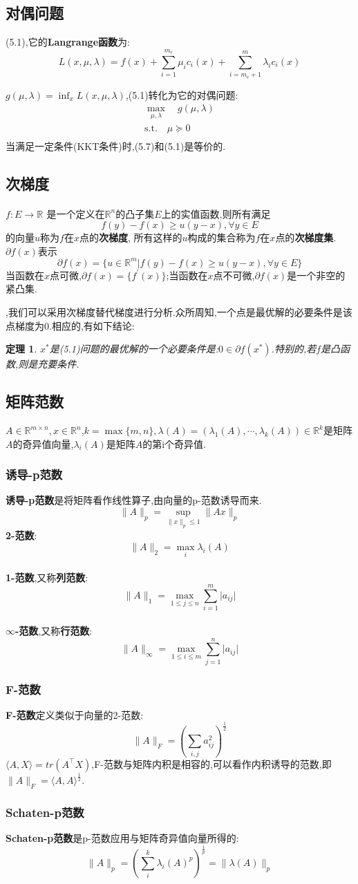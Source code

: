 \documentclass[UTF8]{ctexart}
\newtheorem{theo}{定理}[section]
\newcommand{\s}{\quad}
\renewcommand{\b}{\textbf}
\newcommand{\p}{\paragraph{}\s}
\newcommand{\ssect}{\subsection}
\newcommand{\sssect}{\subsubsection}
\newcommand{\equSplit}[1]{\begin{equation}\begin{split}#1\end{split}\end{equation}}
\newcommand{\equ}[1]{\begin{equation}#1\end{equation}}
\newcommand{\Tst}{\text{s.t.}\s}
\newcommand{\abs}[1]{\lvert#1\rvert}
\newcommand{\norm}[1]{\lVert#1\rVert}
\newcommand{\inprod}[1]{\langle#1\rangle}
\newcommand{\Real}[1]{\mathbb{R}^{#1}}
\numberwithin{equation}{section}
\begin{document}
\ssect{对偶问题}

(5.1),它的\b{Langrange函数}为:
\equ{L(x,\mu,\lambda)=f(x)+\sum^{m_e}_{i=1}\mu_ic_i(x)+\sum^{m}_{i=m_e+1}\lambda_ic_i(x)}

$g(\mu,\lambda)=\inf_xL(x,\mu,\lambda)$,(5.1)转化为它的对偶问题:
\equSplit{
	\max_{\mu,\lambda}\s g(\mu,\lambda)\\
	\Tst\mu\succeq0\\
}
当满足一定条件(KKT条件)时,(5.7)和(5.1)是等价的.

\ssect{次梯度}

\p$f:E\rightarrow\Real{}$
是一个定义在$\Real{n}$的凸子集$E$上的实值函数,则所有满足
\equ{f(y)-f(x)\geq u(y-x),\forall y\in E}
的向量$u$称为$f$在$x$点的\b{次梯度},
所有这样的$u$构成的集合称为$f$在$x$点的\b{次梯度集}.
$\partial f(x)$表示
\equ{\partial f(x)=\{u\in\Real{m}\vert f(y)-f(x)\geq u(y-x),\forall y\in E\}}
当函数在$x$点可微,$\partial f(x)=\{f^\prime(x)\}$;当函数在$x$点不可微,$\partial f(x)$是一个非空的紧凸集.

,我们可以采用次梯度替代梯度进行分析.众所周知,一个点是最优解的必要条件是该点梯度为0.相应的,有如下结论:
\begin{theo}
	$x^*$是(5.1)问题的最优解的一个必要条件是:$0\in\partial f(x^*)$.特别的,若$f$是凸函数,则是充要条件.
\end{theo}

\ssect{矩阵范数}
$A\in\Real{m\times n},x\in\Real{n}$,$k=\max\{m,n\},\lambda(A)=(\lambda_1(A),\cdots,\lambda_k(A))\in\Real{k}$是矩阵$A$的奇异值向量,$\lambda_i(A)$是矩阵$A$的第i个奇异值.
\sssect{诱导-p范数}
\b{诱导-p范数}是将矩阵看作线性算子,由向量的p-范数诱导而来.
\[\norm{A}_p=\sup_{\norm{x}_p\leq1}\norm{Ax}_p\]
\b{2-范数}:
\[\norm{A}_2=\max_i\lambda_i(A)\]

\p\b{1-范数},又称\b{列范数}:
\[\norm{A}_1=\max_{1\leq j\leq n}\sum_{i=1}^m\abs{a_{ij}}\]

\p\b{$\infty$-范数},又称\b{行范数}:
\[\norm{A}_\infty=\max_{1\leq i\leq m}\sum_{j=1}^n\abs{a_{ij}}\]

\sssect{F-范数}
\b{F-范数}定义类似于向量的2-范数:
\[\norm{A}_F=(\sum_{i,j}a_{ij}^2)^{\frac{1}{2}}\]
$\inprod{A,X}=tr(A^\top X)$,F-范数与矩阵内积是相容的,可以看作内积诱导的范数,即$\norm{A}_F=\inprod{A,A}^{\frac{1}{2}}$.

\sssect{Schaten-p范数}
\b{Schaten-p范数}是p-范数应用与矩阵奇异值向量所得的:
\[\norm{A}_p=(\sum_i^k\lambda_i(A)^p)^{\frac{1}{p}}=\norm{\lambda(A)}_p\]
\end{document}
